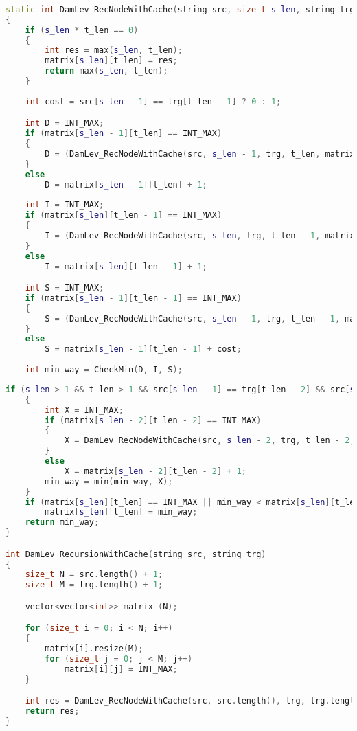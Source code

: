 \par   \text{~~~~~~}
\par   \text{~~~~~~}
        \begin{lstlisting}[language=C++, label=lst:matr:DamLevCache1, caption=Функция рекурсивного поиска расстояния Дамерау-Левенштейна с кэшированием]
        	
static int DamLev_RecNodeWithCache(string src, size_t s_len, string trg, size_t t_len, vector<vector<int>> &matrix)
{
    if (s_len * t_len == 0)
    {
        int res = max(s_len, t_len);
        matrix[s_len][t_len] = res;
        return max(s_len, t_len);
    }
    
    int cost = src[s_len - 1] == trg[t_len - 1] ? 0 : 1;

    int D = INT_MAX;
    if (matrix[s_len - 1][t_len] == INT_MAX)
    {
        D = (DamLev_RecNodeWithCache(src, s_len - 1, trg, t_len, matrix) + 1);
    }
    else
        D = matrix[s_len - 1][t_len] + 1;
    
    int I = INT_MAX;
    if (matrix[s_len][t_len - 1] == INT_MAX)
    {
        I = (DamLev_RecNodeWithCache(src, s_len, trg, t_len - 1, matrix) + 1);
    }
    else
        I = matrix[s_len][t_len - 1] + 1;

    int S = INT_MAX;
    if (matrix[s_len - 1][t_len - 1] == INT_MAX)
    {
        S = (DamLev_RecNodeWithCache(src, s_len - 1, trg, t_len - 1, matrix) + cost);
    }
    else
        S = matrix[s_len - 1][t_len - 1] + cost;
    
    int min_way = CheckMin(D, I, S);

 \end{lstlisting}
\par   \text{~~~~~~}

\par   \text{~~~~~~}
\par   \text{~~~~~~}
\begin{lstlisting}[language=C++, label=lst:matr:DamLevCache2, caption=Функция рекурсивного поиска расстояния Дамерау-Левенштейна с кэшированием]
    if (s_len > 1 && t_len > 1 && src[s_len - 1] == trg[t_len - 2] && src[s_len - 2] == trg[t_len - 1])
    {
        int X = INT_MAX;
        if (matrix[s_len - 2][t_len - 2] == INT_MAX)
        {
            X = DamLev_RecNodeWithCache(src, s_len - 2, trg, t_len - 2, matrix) + 1;
        }
        else
            X = matrix[s_len - 2][t_len - 2] + 1;
        min_way = min(min_way, X);
    }
    if (matrix[s_len][t_len] == INT_MAX || min_way < matrix[s_len][t_len])
        matrix[s_len][t_len] = min_way;
    return min_way;
}

int DamLev_RecursionWithCache(string src, string trg)
{
    size_t N = src.length() + 1;
    size_t M = trg.length() + 1;

    vector<vector<int>> matrix (N);

    for (size_t i = 0; i < N; i++)
    {
        matrix[i].resize(M);
        for (size_t j = 0; j < M; j++)
            matrix[i][j] = INT_MAX;
    }

    int res = DamLev_RecNodeWithCache(src, src.length(), trg, trg.length(), matrix);
    return res;
}
        \end{lstlisting}
    
